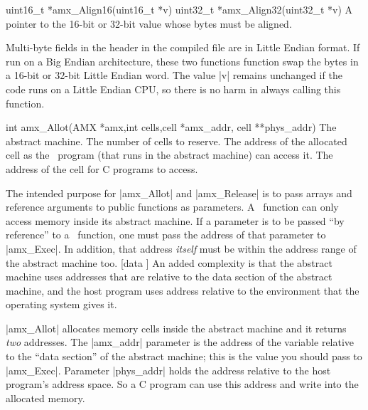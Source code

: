 \syntaxp uint16_t *amx_Align16(uint16_t *v)
\nextitem
\syntaxp uint32_t *amx_Align32(uint32_t *v)
        A pointer to the 16-bit or 32-bit value whose bytes must be aligned.

\notes
      
    Multi-byte fields in the header in the compiled file are in Little Endian format.
    If run on a Big Endian architecture, these two functions function swap the bytes in a
    16-bit or 32-bit Little Endian word. The value |v| remains unchanged if the code
    runs on a Little Endian CPU, so there is no harm in always calling this
    function.

\syntaxp int amx_Allot(AMX *amx,int cells,cell *amx_addr, \lbreak
                       cell **phys_addr)
        The abstract machine.
        The number of cells to reserve.
        The address of the allocated cell as the \Small\ program (that runs in
        the abstract machine) can access it.
        The address of the cell for C programs to access.

\notes
    The intended purpose for |amx_Allot| and |amx_Release| is to pass arrays
    and reference arguments to public functions as parameters. A \Small\ function
    can only access memory inside its abstract machine. If a parameter is to
    be passed ``by reference'' to a \Small\ function, one must pass the address
    of that parameter to |amx_Exec|. In addition, that address {\it itself\/} must
    be within the address range of the abstract machine too.
     [data \midtilde]
    An added complexity is that the abstract machine uses addresses that are
    relative to the data section of the abstract machine, and the host program
    uses address relative to the environment that the operating system gives it.

    |amx_Allot| allocates memory cells inside the abstract machine and it
    returns {\it two\/} addresses. The |amx_addr| parameter is the address of the variable
    relative to the ``data section'' of the abstract machine; this is the value you should pass to
    |amx_Exec|. Parameter |phys_addr| holds the address relative to the host
    program's address space. So a C program can use this address and write into
    the allocated memory.

